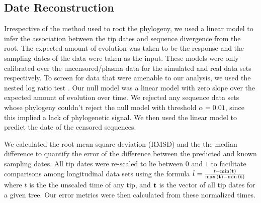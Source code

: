 \documentclass[12pt]{article}
\begin{document}
\subsection * {Date Reconstruction} \label{subsec:daterecon}

Irrespective of the method used to root the phylogeny, we used a linear model to infer the association between the tip dates and sequence divergence from the root. 
The expected amount of evolution was taken to be the response and the sampling dates of the data were taken as the input. 
These models were only calibrated over the uncensored/plasma data for the simulated and real data sets respectively.
To screen for data that were amenable to our analysis, we used the nested log ratio test \citep{Ho14}. 
Our null model was a linear model with zero slope over the expected amount of evolution over time.
We rejected any sequence data sets whose phylogeny couldn't reject the null model with threshold $\alpha=0.01$, since this implied a lack of phylogenetic signal. We then used the linear model to predict the date of the censored sequences.

We calculated the root mean square deviation (RMSD) and the the median difference to quantify the error of the difference between the predicted and known sampling dates.
All tip dates were re-scaled to lie between $0$ and $1$ to facilitate comparisons among longitudinal data sets using the formula $ \hat{t} = \frac{t - \min(\bf{t}) }{ \max{(\bf{t})} - \min{(\bf{t}})}$ where $t$ is the the unscaled time of any tip, and $\bf{t}$ is the vector of all tip dates for a given tree. 
Our error metrics were then calculated from these normalized times.%
\end{document}
